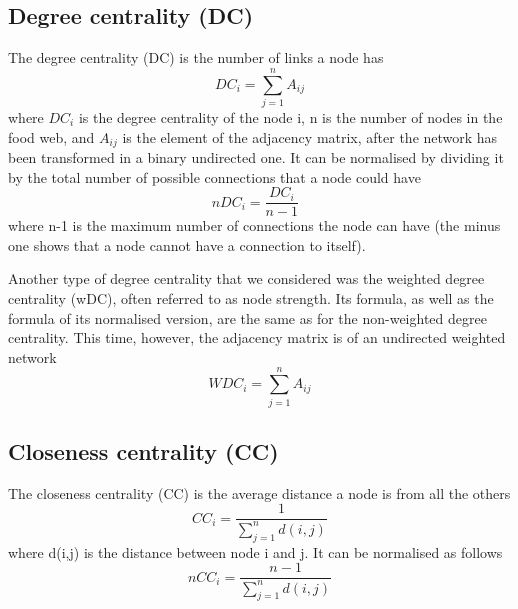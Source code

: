 \documentclass[twocolumn]{article}
\begin{document}
	\subsection*{Degree centrality (DC)}
		\par
		The degree centrality (DC) is the number of links a node has \citep{Wasserman1994}
					\begin{equation}
								DC_i=\sum_{j=1}^{n}A_{ij}
					\end{equation}
		where $DC_i$ is the degree centrality of the node i, n is the number of nodes in the food web, and $A_{ij}$ is the element of the adjacency matrix, after the network has been transformed in a binary undirected one.
		It can be normalised by dividing it by the total number of possible connections that a node could have \citep{Wasserman1994}
					\begin{equation}
								nDC_i=\frac{DC_i}{n-1}\ \ \
					\end{equation}
		where n-1 is the maximum number of connections the node can have (the minus one shows that a node cannot have a connection to itself).
		\par
		Another type of degree centrality that we considered was the weighted degree centrality (wDC), often referred to as node strength. Its formula, as well as the formula of its normalised version, are the same as for the non-weighted degree centrality. This time, however, the adjacency matrix is of an undirected weighted network \citep{Fornito2016}
					\begin{equation}
								WDC_i=\sum_{j=1}^{n}A_{ij}
					\end{equation}
	\subsection*{Closeness centrality (CC)}
		\par
		The closeness centrality (CC) is the average distance a node is from all the others \citep{Wasserman1994}
					\begin{equation}
								CC_i=\frac{1}{\sum\limits_{j=1}^n d(i,j)}
					\end{equation}
		where d(i,j) is the distance between node i and j. It can be normalised as follows \citep{Wasserman1994}
					\begin{equation}
								nCC_i=\frac{n-1}{\sum\limits_{j=1}^n d(i,j)}
					\end{equation}
\end{document}
